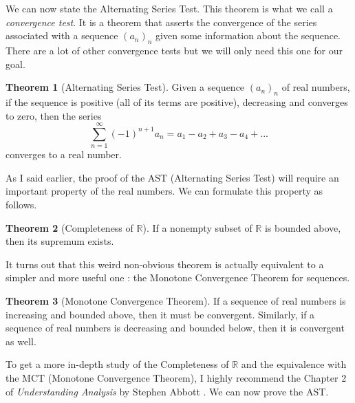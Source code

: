 \documentclass[12pt]{article}
\newcommand{\R}{\mathbb{R}}
\theoremstyle{definition}
\newtheorem*{theorem}{Theorem}
\newcounter{prop}[section]
\begin{document}
We can now state the Alternating Series Test. This theorem is what we call a \textit{convergence test}. It is a theorem that asserts the convergence of the series associated with a sequence $(a_n)_n$ given some information about the sequence. There are a lot of other convergence tests but we will only need this one for our goal.

\begin{theorem}[Alternating Series Test]
    Given a sequence $(a_n)_n$ of real numbers, if the sequence is positive (all of its terms are positive), decreasing and converges to zero, then the series
    $$\sum_{n=1}^{\infty}(-1)^{n+1}a_n = a_1 - a_2 + a_3 - a_4 + ... $$
    converges to a real number.
\end{theorem}

As I said earlier, the proof of the AST (Alternating Series Test) will require an important property of the real numbers. We can formulate this property as follows.

\begin{theorem}[Completeness of $\R$]
    If a nonempty subset of $\R$ is bounded above, then its supremum exists.
\end{theorem}

It turns out that this weird non-obvious theorem is actually equivalent to a simpler and more useful one : the Monotone Convergence Theorem for sequences.

\begin{theorem}[Monotone Convergence Theorem]
    If a sequence of real numbers is increasing and bounded above, then it must be convergent. Similarly, if a sequence of real numbers is decreasing and bounded below, then it is convergent as well.
\end{theorem}

To get a more in-depth study of the Completeness of $\R$ and the equivalence with the MCT (Monotone Convergence Theorem), I highly recommend the Chapter 2 of \textit{Understanding Analysis} by Stephen Abbott \cite{understanding_analysis}. We can now prove the AST.
\end{document}
